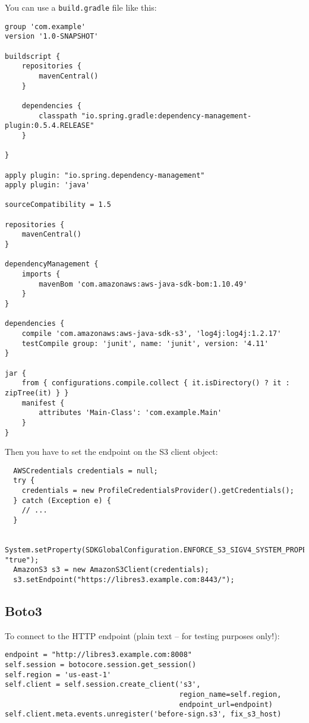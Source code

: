 You can use a \verb|build.gradle| file like this:
\begin{lstlisting}
group 'com.example'
version '1.0-SNAPSHOT'

buildscript {
    repositories {
        mavenCentral()
    }

    dependencies {
        classpath "io.spring.gradle:dependency-management-plugin:0.5.4.RELEASE"
    }

}

apply plugin: "io.spring.dependency-management"
apply plugin: 'java'

sourceCompatibility = 1.5

repositories {
    mavenCentral()
}

dependencyManagement {
    imports {
        mavenBom 'com.amazonaws:aws-java-sdk-bom:1.10.49'
    }
}

dependencies {
    compile 'com.amazonaws:aws-java-sdk-s3', 'log4j:log4j:1.2.17'
    testCompile group: 'junit', name: 'junit', version: '4.11'
}

jar {
    from { configurations.compile.collect { it.isDirectory() ? it : zipTree(it) } }
    manifest {
        attributes 'Main-Class': 'com.example.Main'
    }
}
\end{lstlisting}

Then you have to set the endpoint on the S3 client object:
\begin{lstlisting}
  AWSCredentials credentials = null;
  try {
    credentials = new ProfileCredentialsProvider().getCredentials();
  } catch (Exception e) {
    // ...
  }

  System.setProperty(SDKGlobalConfiguration.ENFORCE_S3_SIGV4_SYSTEM_PROPERTY, "true");
  AmazonS3 s3 = new AmazonS3Client(credentials);
  s3.setEndpoint("https://libres3.example.com:8443/");
\end{lstlisting}

\subsection{Boto3}

To connect to the HTTP endpoint (plain text -- for testing purposes only!):
\begin{lstlisting}
endpoint = "http://libres3.example.com:8008"
self.session = botocore.session.get_session()
self.region = 'us-east-1'
self.client = self.session.create_client('s3',
                                         region_name=self.region,
                                         endpoint_url=endpoint)
self.client.meta.events.unregister('before-sign.s3', fix_s3_host)
\end{lstlisting}

